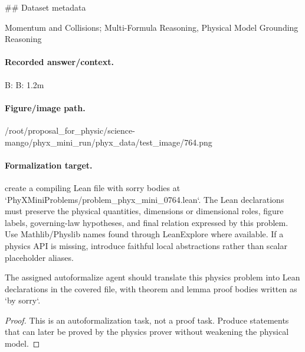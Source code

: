 \#\# Dataset metadata

Momentum and Collisions; Multi-Formula Reasoning, Physical Model Grounding Reasoning

\paragraph{Recorded answer/context.}
B: B: 1.2m

\paragraph{Figure/image path.}
/root/proposal\_for\_physic/science-mango/phyx\_mini\_run/phyx\_data/test\_image/764.png

\paragraph{Formalization target.}
create a compiling Lean file with sorry bodies at `PhyXMiniProblems/problem\_phyx\_mini\_0764.lean`. The Lean declarations must preserve the physical quantities, dimensions or dimensional roles, figure labels, governing-law hypotheses, and final relation expressed by this problem.
Use Mathlib/Physlib names found through LeanExplore where available. If a physics API is missing, introduce faithful local abstractions rather than scalar placeholder aliases.

\begin{theorem}
\label{thm:physics:phyx_mini_0764:target}
The assigned autoformalize agent should translate this physics problem into Lean declarations in the covered file, with theorem and lemma proof bodies written as `by sorry`.
\end{theorem}
\begin{proof}
This is an autoformalization task, not a proof task. Produce statements that can later be proved by the physics prover without weakening the physical model.
\end{proof}

